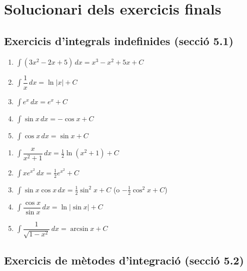 \documentclass[12pt]{article}
\begin{document}
\section*{Solucionari dels exercicis finals}

\subsection*{Exercicis d'integrals indefinides (secció 5.1)}

\begin{solucio}
\begin{enumerate}
    \item $\displaystyle \int (3x^2 - 2x + 5)\,dx = x^3 - x^2 + 5x + C$
    \item $\displaystyle \int \dfrac{1}{x}\,dx = \ln|x| + C$
    \item $\displaystyle \int e^x\,dx = e^x + C$
    \item $\displaystyle \int \sin x\,dx = -\cos x + C$
    \item $\displaystyle \int \cos x\,dx = \sin x + C$
\end{enumerate}
\end{solucio}

\begin{solucio}
\begin{enumerate}
    \item $\displaystyle \int \dfrac{x}{x^2+1}\,dx = \frac{1}{2}\ln(x^2+1) + C$
    \item $\displaystyle \int x e^{x^2}\,dx = \frac{1}{2}e^{x^2} + C$
    \item $\displaystyle \int \sin x \cos x\,dx = \frac{1}{2}\sin^2 x + C$ (o $-\frac{1}{2}\cos^2 x + C$)
    \item $\displaystyle \int \dfrac{\cos x}{\sin x}\,dx = \ln|\sin x| + C$
    \item $\displaystyle \int \dfrac{1}{\sqrt{1-x^2}}\,dx = \arcsin x + C$
\end{enumerate}
\end{solucio}

\subsection*{Exercicis de mètodes d'integració (secció 5.2)}
\end{document}
